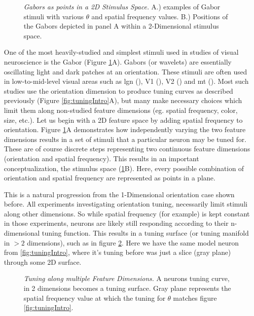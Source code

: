 \begin{figure}[ht]
	\caption{\textit{Gabors as points in a 2D Stimulus Space.} A.) examples of Gabor stimuli with various $\theta$ and spatial frequency values. B.) Positions of the Gabors depicted in panel A within a 2-Dimensional stimulus space. }
	\label{fig:gabor}
\end{figure}

One of the most heavily-studied and simplest stimuli used in studies of visual neuroscience is the Gabor (Figure \ref{fig:gabor}A). Gabors (or wavelets) are essentially oscillating light and dark patches at an orientation. These stimuli are often used in low-to-mid-level visual areas such as \gls{lgn} (\cite{Mahon2001}), V1 (\cite{Bredfeldt2002,Lennie1990, Tanigawa2010}), V2 (\cite{Gegenfurtner1996, Liu2020}) and \gls{mt} (\cite{Movshon1996, Rust2006}). Most such studies use the orientation dimension to produce tuning curves as described previously (Figure \ref{fig:tuningIntro}A), but many make necessary choices which limit them along non-studied feature dimensions (eg. spatial frequency, color, size, etc.). Let us begin with a 2D feature space by adding spatial frequency to orientation. Figure \ref{fig:gabor}A demonstrates how independently varying the two feature dimensions results in a set of stimuli that a particular neuron may be tuned for. These are of course discrete steps representing two continuous feature dimensions (orientation and spatial frequency). This results in an important conceptualization, the stimulus space (\ref{fig:gabor}B). Here, every possible combination of orientation and spatial frequency are represented as points in a plane. 

This is a natural progression from the 1-Dimensional orientation case shown before. All experiments investigating orientation tuning, necessarily limit stimuli along other dimensions. So while spatial frequency (for example) is kept constant in those experiments, neurons are likely still responding according to their n-dimensional tuning function. This results in a tuning surface (or tuning manifold in $>2$ dimensions), such as in figure \ref{fig:2Dtuning}. Here we have the same model neuron from \ref{fig:tuningIntro}, where it's tuning before was just a slice (gray plane) through some 2D surface.

\begin{figure}[h]
		\caption{\textit{Tuning along multiple Feature Dimensions.} A neurons tuning curve, in 2 dimensions becomes a tuning surface. Gray plane represents the spatial frequency value at which the tuning for $\theta$ matches figure \ref{fig:tuningIntro}.}
		\label{fig:2Dtuning}
\end{figure}


